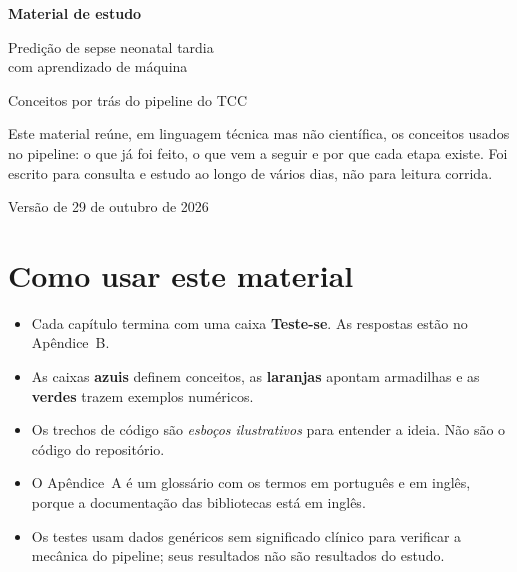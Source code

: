 \documentclass[11pt,a4paper]{article}
\begin{document}
\begin{titlepage}
\centering
\vspace*{3cm}
{\Huge\bfseries\color{azul} Material de estudo\par}
\vspace{0.6cm}
{\Large Predição de sepse neonatal tardia\\com aprendizado de máquina\par}
\vspace{1.2cm}
{\large Conceitos por trás do pipeline do TCC\par}
\vspace{3cm}
\begin{minipage}{0.8\textwidth}
\centering
Este material reúne, em linguagem técnica mas não científica, os conceitos usados no pipeline:
o que já foi feito, o que vem a seguir e por que cada etapa existe.
Foi escrito para consulta e estudo ao longo de vários dias, não para leitura corrida.
\end{minipage}
\vfill
{\large Versão de 29 de outubro de 2026}\par
\end{titlepage}

\tableofcontents
\newpage

\section*{Como usar este material}

\begin{itemize}
  \item Cada capítulo termina com uma caixa \textbf{Teste-se}. As respostas estão no Apêndice~B.
  \item As caixas \textbf{azuis} definem conceitos, as \textbf{laranjas} apontam armadilhas e as \textbf{verdes} trazem exemplos numéricos.
  \item Os trechos de código são \emph{esboços ilustrativos} para entender a ideia. Não são o código do repositório.
  \item O Apêndice~A é um glossário com os termos em português e em inglês, porque a documentação das bibliotecas está em inglês.
  \item Os testes usam dados genéricos sem significado clínico para verificar a mecânica do pipeline; seus resultados não são resultados do estudo.
\end{itemize}
\end{document}
